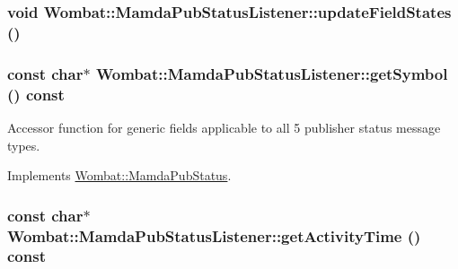 \hypertarget{classWombat_1_1MamdaPubStatusListener_2af5146fb7e9e8b4427e78809c20377a}{
\subsubsection[updateFieldStates]{\setlength{\rightskip}{0pt plus 5cm}void Wombat::Mamda\-Pub\-Status\-Listener::update\-Field\-States ()}}
\label{classWombat_1_1MamdaPubStatusListener_2af5146fb7e9e8b4427e78809c20377a}


\hypertarget{classWombat_1_1MamdaPubStatusListener_6a45bb477632be814f1a3bd00082c06c}{
\subsubsection[getSymbol]{\setlength{\rightskip}{0pt plus 5cm}const char$\ast$ Wombat::Mamda\-Pub\-Status\-Listener::get\-Symbol () const}}
\label{classWombat_1_1MamdaPubStatusListener_6a45bb477632be814f1a3bd00082c06c}


Accessor function for generic fields applicable to all 5 publisher status message types. 



Implements \hyperlink{classWombat_1_1MamdaPubStatus_a891a47fbe902368dbf46ab84773eff9}{Wombat::Mamda\-Pub\-Status}.\hypertarget{classWombat_1_1MamdaPubStatusListener_ffedad037842c408272dbded18f676f6}{
\subsubsection[getActivityTime]{\setlength{\rightskip}{0pt plus 5cm}const char$\ast$ Wombat::Mamda\-Pub\-Status\-Listener::get\-Activity\-Time () const}}
\label{classWombat_1_1MamdaPubStatusListener_ffedad037842c408272dbded18f676f6}




